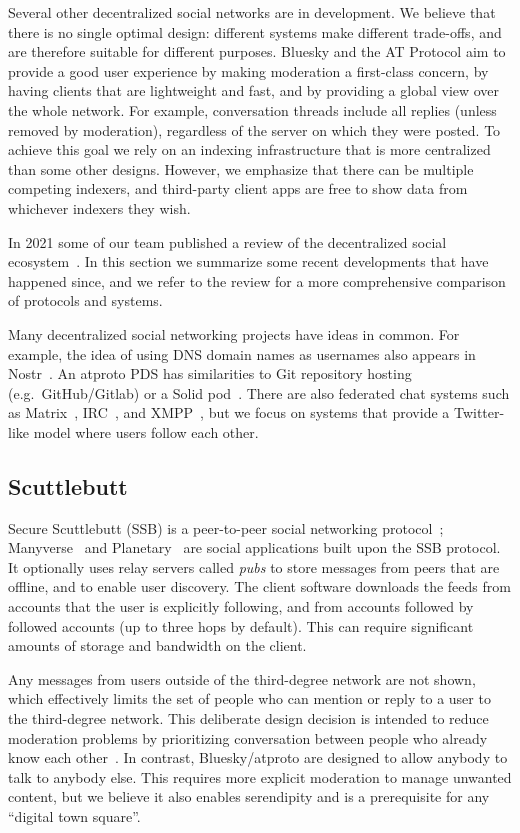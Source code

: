 \documentclass[sigconf,nonacm]{acmart}
\begin{document}
Several other decentralized social networks are in development.
We believe that there is no single optimal design: different systems make different trade-offs, and are therefore suitable for different purposes.
Bluesky and the AT Protocol aim to provide a good user experience by making moderation a first-class concern, by having clients that are lightweight and fast, and by providing a global view over the whole network.
For example, conversation threads include all replies (unless removed by moderation), regardless of the server on which they were posted.
To achieve this goal we rely on an indexing infrastructure that is more centralized than some other designs.
However, we emphasize that there can be multiple competing indexers, and third-party client apps are free to show data from whichever indexers they wish.

In 2021 some of our team published a review of the decentralized social ecosystem~\cite{EcosystemReview}.
In this section we summarize some recent developments that have happened since, and we refer to the review for a more comprehensive comparison of protocols and systems.

Many decentralized social networking projects have ideas in common.
For example, the idea of using DNS domain names as usernames also appears in Nostr~\cite{NostrDNS}.
An atproto PDS has similarities to Git repository hosting (e.g.\ GitHub/Gitlab) or a Solid pod~\cite{Solid}.
There are also federated chat systems such as Matrix~\cite{Matrix}, IRC~\cite{IRC}, and XMPP~\cite{XMPP}, but we focus on systems that provide a Twitter-like model where users follow each other.

\subsection{Scuttlebutt}

Secure Scuttlebutt (SSB) is a peer-to-peer social networking protocol~\cite{Scuttlebutt}; Manyverse~\cite{Manyverse} and Planetary~\cite{Planetary} are social applications built upon the SSB protocol.
It optionally uses relay servers called \emph{pubs} to store messages from peers that are offline, and to enable user discovery.
The client software downloads the feeds from accounts that the user is explicitly following, and from accounts followed by followed accounts (up to three hops by default).
This can require significant amounts of storage and bandwidth on the client.

Any messages from users outside of the third-degree network are not shown, which effectively limits the set of people who can mention or reply to a user to the third-degree network.
This deliberate design decision is intended to reduce moderation problems by prioritizing conversation between people who already know each other~\cite{ManyverseBluesky}.
In contrast, Bluesky/atproto are designed to allow anybody to talk to anybody else.
This requires more explicit moderation to manage unwanted content, but we believe it also enables serendipity and is a prerequisite for any ``digital town square''.
\end{document}
